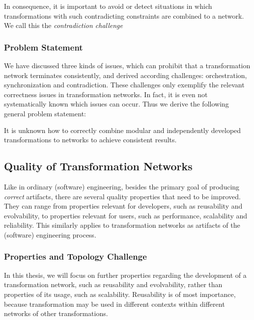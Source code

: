 In consequence, it is important to avoid or detect situations in which transformations with such contradicting constraints are combined to a network.
We call this the \emph{contradiction challenge}

\subsubsection*{Problem Statement}

We have discussed three kinds of issues, which can prohibit that a transformation network terminates consistently, and derived according challenges: orchestration, synchronization and contradiction.
These challenges only exemplify the relevant correctness issues in transformation networks. 
In fact, it is even not systematically known which issues can occur.
Thus we derive the following general problem statement:

\begin{problemstatement}
    It is unknown how to correctly combine modular and independently developed transformations to networks to achieve consistent results.
\end{problemstatement}

\subsection{Quality of Transformation Networks}

Like in ordinary (software) engineering, besides the primary goal of producing \emph{correct} artifacts, there are several quality properties that need to be improved.
They can range from properties relevant for developers, such as reusability and evolvability, to properties relevant for users, such as performance, scalability and reliability.
This similarly applies to transformation networks as artifacts of the (software) engineering process.

\subsubsection*{Properties and Topology Challenge}

In this thesis, we will focus on further properties regarding the development of a transformation network, such as reusability and evolvability, rather than properties of its usage, such as scalability.
Reusability is of most importance, because transformation may be used in different contexts within different networks of other transformations.

